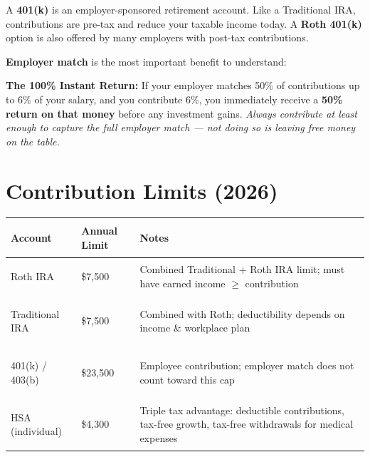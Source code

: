 \documentclass[11pt, letterpaper]{article}
\begin{document}
A \textbf{401(k)} is an employer-sponsored retirement account. Like a Traditional IRA, contributions are pre-tax and reduce your taxable income today. A \textbf{Roth 401(k)} option is also offered by many employers with post-tax contributions.

\textbf{Employer match} is the most important benefit to understand:

\begin{tcolorbox}[colback=notebg, colframe=noteborder, arc=3pt, boxrule=1pt]
\textbf{The 100\% Instant Return:} If your employer matches 50\% of contributions up to 6\% of your salary, and you contribute 6\%, you immediately receive a \textbf{50\% return on that money} before any investment gains. \textit{Always contribute at least enough to capture the full employer match --- not doing so is leaving free money on the table.}
\end{tcolorbox}

\section*{Contribution Limits (2026)}

\noindent
{\renewcommand{\arraystretch}{1.5}
\begin{tabularx}{\textwidth}{>{\bfseries\raggedright\arraybackslash}p{4cm}
                              >{\centering\arraybackslash}p{3cm}
                              >{\raggedright\arraybackslash}X}
\toprule
\rowcolor{tableheader}
\textbf{Account} & \textbf{Annual Limit} & \textbf{Notes} \\
\midrule
\rowcolor{rowA}  Roth IRA          & \$7{,}500      & Combined Traditional + Roth IRA limit; must have earned income $\geq$ contribution \\
\rowcolor{rowB}  Traditional IRA   & \$7{,}500      & Combined with Roth; deductibility depends on income \& workplace plan \\
\rowcolor{rowA}  401(k) / 403(b)   & \$23{,}500     & Employee contribution; employer match does not count toward this cap \\
\rowcolor{rowB}  HSA (individual)  & \$4{,}300      & Triple tax advantage: deductible contributions, tax-free growth, tax-free withdrawals for medical expenses \\
\bottomrule
\end{tabularx}}

\end{document}
